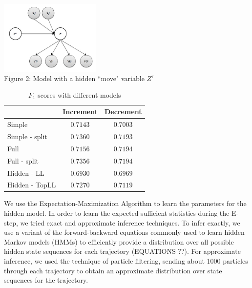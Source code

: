 \documentclass{article} %
\begin{document}
\includegraphics[width=5cm]{hidden.jpg}\\
\small{Figure 2: Model with a hidden ``move" variable $Z^\tau$}

\begin{table}[htdp]
\caption{$F_1$ scores with different models}
\begin{center}
\begin{tabular}{l|c|c|}
 & Increment & Decrement \\ \hline
 Simple & $0.7143$ & $0.7003$ \\
 Simple - split & $0.7360$ & $ 0.7193$ \\
 Full & $0.7156$ & $0.7194$ \\
 Full - split & $0.7356$ & $0.7194$ \\
 Hidden - LL & $0.6930$ & $0.6969$ \\
 Hidden - TopLL & $0.7270$ & $0.7119$
\end{tabular}
\end{center}
\end{table}


We use the Expectation-Maximization Algorithm to learn the parameters for the hidden model. In order to learn the expected sufficient statistics during the E-step, we tried exact and approximate inference techniques. To infer exactly, we use a variant of the forward-backward equations commonly used to learn hidden Markov models (HMMs) to efficiently provide a distribution over all possible hidden state sequences for each trajectory (EQUATIONS ??). For approximate inference, we used the technique of particle filtering, sending about 1000 particles through each trajectory to obtain an approximate distribution over state sequences for the trajectory.
\end{document}
